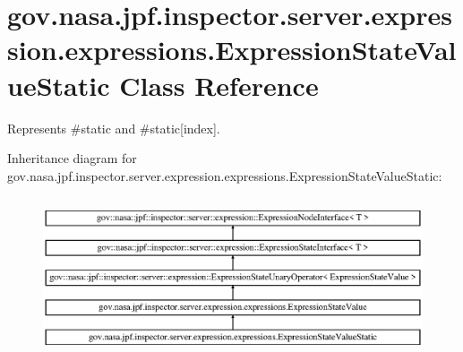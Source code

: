 \hypertarget{classgov_1_1nasa_1_1jpf_1_1inspector_1_1server_1_1expression_1_1expressions_1_1_expression_state_value_static}{}\section{gov.\+nasa.\+jpf.\+inspector.\+server.\+expression.\+expressions.\+Expression\+State\+Value\+Static Class Reference}
\label{classgov_1_1nasa_1_1jpf_1_1inspector_1_1server_1_1expression_1_1expressions_1_1_expression_state_value_static}


Represents \#static and \#static\mbox{[}index\mbox{]}.  


Inheritance diagram for gov.\+nasa.\+jpf.\+inspector.\+server.\+expression.\+expressions.\+Expression\+State\+Value\+Static\+:\begin{figure}[H]
\begin{center}
\leavevmode
\includegraphics[height=4.745763cm]{classgov_1_1nasa_1_1jpf_1_1inspector_1_1server_1_1expression_1_1expressions_1_1_expression_state_value_static}
\end{center}
\end{figure}
